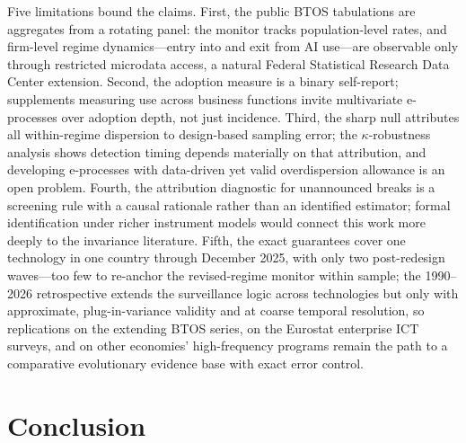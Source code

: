 \documentclass[review,authoryear,12pt]{elsarticle}
\begin{document}
Five limitations bound the claims. First, the public BTOS tabulations are aggregates from a rotating panel: the monitor tracks population-level rates, and firm-level regime dynamics---entry into and exit from AI use---are observable only through restricted microdata access, a natural Federal Statistical Research Data Center extension. Second, the adoption measure is a binary self-report; supplements measuring use across business functions \citep{census2026pr} invite multivariate e-processes over adoption depth, not just incidence. Third, the sharp null attributes all within-regime dispersion to design-based sampling error; the $\kappa$-robustness analysis shows detection timing depends materially on that attribution, and developing e-processes with data-driven yet valid overdispersion allowance is an open problem. Fourth, the attribution diagnostic for unannounced breaks is a screening rule with a causal rationale rather than an identified estimator; formal identification under richer instrument models would connect this work more deeply to the invariance literature. Fifth, the exact guarantees cover one technology in one country through December 2025, with only two post-redesign waves---too few to re-anchor the revised-regime monitor within sample; the 1990--2026 retrospective extends the surveillance logic across technologies but only with approximate, plug-in-variance validity and at coarse temporal resolution, so replications on the extending BTOS series, on the Eurostat enterprise ICT surveys, and on other economies' high-frequency programs remain the path to a comparative evolutionary evidence base with exact error control.

\section{Conclusion}
\label{sec:conclusion}
\end{document}
